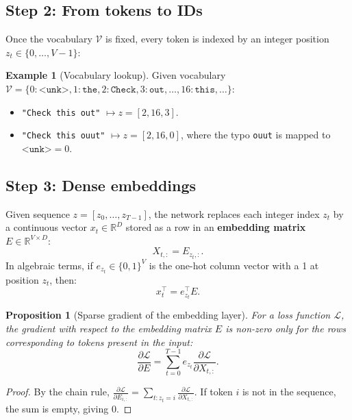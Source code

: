 \documentclass[11pt,a4paper]{article}
\newcommand{\R}{\mathbb{R}}
\newcommand{\slides}[1]{\par\nopagebreak\noindent{\normalfont\small\emph{(slides #1)}}\par\nopagebreak\vspace{2pt}}
\theoremstyle{definition}
\newtheorem{example}[definition]{Example}
\theoremstyle{plain}
\newtheorem{proposition}[definition]{Proposition}
\begin{document}
\subsection{Step 2: From tokens to IDs}\slides{7 / 84}
Once the vocabulary $\mathcal{V}$ is fixed, every token is indexed by an integer position $z_t \in \{0, \dots, V-1\}$:
\begin{example}[Vocabulary lookup]
Given vocabulary $\mathcal{V} = \{0: \texttt{<unk>}, 1: \texttt{the}, 2: \texttt{Check}, 3: \texttt{out}, \dots, 16: \texttt{this}, \dots\}$:
\begin{itemize}[nosep]
\item \texttt{"Check this out"} $\longmapsto z = [2, 16, 3]$.
\item \texttt{"Check this ouut"} $\longmapsto z = [2, 16, 0]$, where the typo \texttt{ouut} is mapped to $\texttt{<unk>} = 0$.
\end{itemize}
\end{example}

\subsection{Step 3: Dense embeddings}\slides{8 / 84}
Given sequence $z = [z_0, \dots, z_{T-1}]$, the network replaces each integer index $z_t$ by a continuous vector $x_t \in \R^D$ stored as a row in an \textbf{embedding matrix} $E \in \R^{V \times D}$:
\begin{equation}\label{eq:embed_lookup}
X_{t,:} = E_{z_t,:}.
\end{equation}
In algebraic terms, if $e_{z_t} \in \{0, 1\}^V$ is the one-hot column vector with a 1 at position $z_t$, then:
\begin{equation}
x_t^\top = e_{z_t}^\top E.
\end{equation}

\begin{proposition}[Sparse gradient of the embedding layer]
For a loss function $\mathcal{L}$, the gradient with respect to the embedding matrix $E$ is non-zero only for the rows corresponding to tokens present in the input:
\begin{equation}
\frac{\partial \mathcal{L}}{\partial E} = \sum_{t=0}^{T-1} e_{z_t} \frac{\partial \mathcal{L}}{\partial X_{t,:}}.
\end{equation}
\end{proposition}
\begin{proof}
By the chain rule, $\frac{\partial \mathcal{L}}{\partial E_{i,:}} = \sum_{t: z_t = i} \frac{\partial \mathcal{L}}{\partial X_{t,:}}$. If token $i$ is not in the sequence, the sum is empty, giving 0.
\end{proof}
\end{document}
